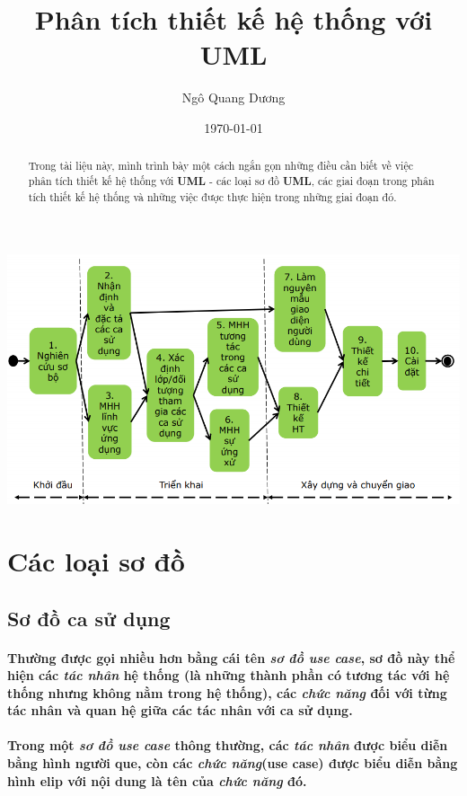 \documentclass{article}
\title{\textbf{Phân tích thiết kế hệ thống với UML}}
\author{Ngô Quang Dương}
\date{\today}
\begin{document}
\maketitle

\begin{abstract}Trong tài liệu này, mình trình bày một cách ngắn gọn những điều cần biết về việc phân tích thiết kế hệ thống với \textbf{UML} - các loại sơ đồ \textbf{UML}, các giai đoạn trong phân tích thiết kế hệ thống và những việc được thực hiện trong những giai đoạn đó.
\end{abstract}

\tableofcontents

\begin{center}
  \includegraphics[scale=0.6]{../pictures/rup.PNG}
\end{center}

\section{Các loại sơ đồ}
  
  \subsection{Sơ đồ ca sử dụng}
  
  \paragraph{\textnormal{Thường được gọi nhiều hơn bằng cái tên \textit{sơ đồ use case}, sơ đồ này thể hiện các \textit{tác nhân} hệ thống (là những thành phần có tương tác với hệ thống nhưng không nằm trong hệ thống), các \textit{chức năng} đối với từng tác nhân và quan hệ giữa các tác nhân với ca sử dụng.}}

  \paragraph{\textnormal{Trong một \textit{sơ đồ use case} thông thường, các \textit{tác nhân} được biểu diễn bằng hình người que, còn các \textit{chức năng}(use case) được biểu diễn bằng hình elip với nội dung là tên của \textit{chức năng} đó.}}
\end{document}
